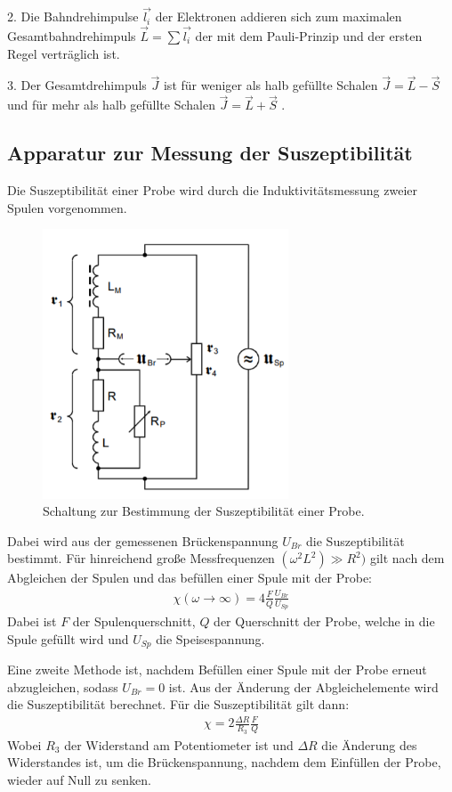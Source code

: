2. Die Bahndrehimpulse $\vec{l_i}$ der Elektronen addieren sich zum maximalen Gesamtbahndrehimpuls $\vec{L} = \sum \vec{l_i}$ der mit
dem Pauli-Prinzip und der ersten Regel verträglich ist.

3. Der Gesamtdrehimpuls $\vec{J}$ ist für weniger als halb gefüllte Schalen $\vec{J} = \vec{L}- \vec{S}$ und für mehr als halb gefüllte Schalen
$\vec{J} = \vec{L} + \vec{S}$ .


\subsection{Apparatur zur Messung der Suszeptibilität}
Die Suszeptibilität einer Probe wird durch die Induktivitätsmessung zweier Spulen vorgenommen.

\begin{figure}[H]
  \centering
  \includegraphics[height=8cm]{brueckenschaltung.PNG}
  \caption{Schaltung zur Bestimmung der Suszeptibilität einer Probe. \cite{sample}}
  \label{fig:bruecke}
\end{figure}

Dabei wird aus der gemessenen Brückenspannung $U_{Br}$ die Suszeptibilität bestimmt. Für hinreichend große Messfrequenzen
$(\omega^2 L^2) \gg R^2)$ gilt nach dem Abgleichen der Spulen und das befüllen einer Spule mit der Probe:
\begin{align}
  \chi(\omega \rightarrow \infty) = 4 \frac{F}{Q} \frac{U_{Br}}{U_{Sp}}
\end{align}
Dabei ist $F$ der Spulenquerschnitt, $Q$ der Querschnitt der Probe, welche in die Spule gefüllt wird und $U_{Sp}$ die
Speisespannung.

Eine zweite Methode ist, nachdem Befüllen einer Spule mit der Probe erneut abzugleichen, sodass $U_{Br} = 0$ ist. Aus
der Änderung der Abgleichelemente wird die Suszeptibilität berechnet. Für die Suszeptibilität gilt dann:
\begin{align}
  \chi = 2 \frac{\Delta R}{R_3} \frac{F}{Q}
\end{align}
Wobei $R_3$ der Widerstand am Potentiometer ist und $\Delta R$ die Änderung des Widerstandes ist, um die
Brückenspannung, nachdem dem Einfüllen der Probe, wieder auf Null zu senken.

